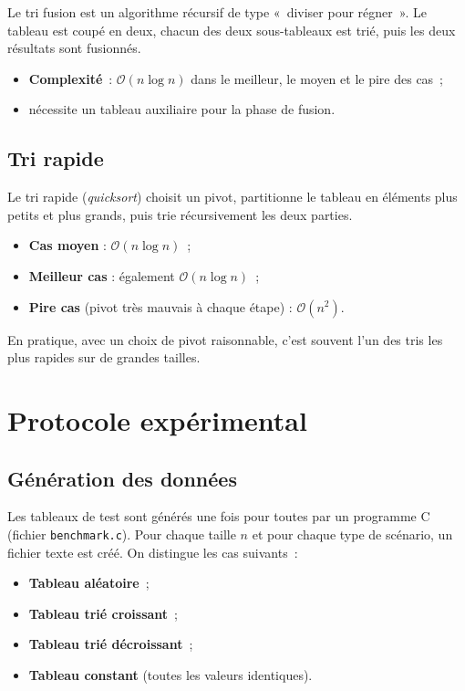 \documentclass[11pt,a4paper]{article}
\begin{document}
Le tri fusion est un algorithme récursif de type «~diviser pour
régner~».  
Le tableau est coupé en deux, chacun des deux sous-tableaux est trié,
puis les deux résultats sont fusionnés.

\begin{itemize}
  \item \textbf{Complexité}~: $\mathcal{O}(n \log n)$ dans le meilleur,
        le moyen et le pire des cas~;
  \item nécessite un tableau auxiliaire pour la phase de fusion.
\end{itemize}

\subsection{Tri rapide}

Le tri rapide (\emph{quicksort}) choisit un pivot, partitionne le
tableau en éléments plus petits et plus grands, puis trie récursivement
les deux parties.

\begin{itemize}
  \item \textbf{Cas moyen} : $\mathcal{O}(n \log n)$~;
  \item \textbf{Meilleur cas} : également $\mathcal{O}(n \log n)$~;
  \item \textbf{Pire cas} (pivot très mauvais à chaque étape) :
        $\mathcal{O}(n^2)$.
\end{itemize}

En pratique, avec un choix de pivot raisonnable, c'est souvent l'un des
tris les plus rapides sur de grandes tailles.

\section{Protocole expérimental}

\subsection{Génération des données}

Les tableaux de test sont générés une fois pour toutes par un programme
C (fichier \texttt{benchmark.c}).  
Pour chaque taille $n$ et pour chaque type de scénario, un fichier texte
est créé.  
On distingue les cas suivants~:

\begin{itemize}
  \item \textbf{Tableau aléatoire}~;
  \item \textbf{Tableau trié croissant}~;
  \item \textbf{Tableau trié décroissant}~;
  \item \textbf{Tableau constant} (toutes les valeurs identiques).
\end{itemize}
\end{document}
